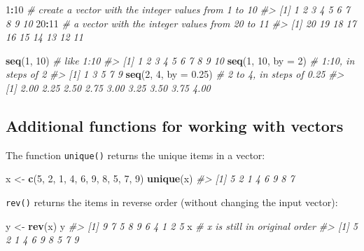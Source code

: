\documentclass[]{book}
\newenvironment{Shaded}{\begin{snugshade}}{\end{snugshade}}
\newcommand{\CommentTok}[1]{\textcolor[rgb]{0.56,0.35,0.01}{\textit{#1}}}
\newcommand{\DataTypeTok}[1]{\textcolor[rgb]{0.13,0.29,0.53}{#1}}
\newcommand{\DecValTok}[1]{\textcolor[rgb]{0.00,0.00,0.81}{#1}}
\newcommand{\FloatTok}[1]{\textcolor[rgb]{0.00,0.00,0.81}{#1}}
\newcommand{\KeywordTok}[1]{\textcolor[rgb]{0.13,0.29,0.53}{\textbf{#1}}}
\newcommand{\NormalTok}[1]{#1}
\newcommand{\OperatorTok}[1]{\textcolor[rgb]{0.81,0.36,0.00}{\textbf{#1}}}
\newcommand{\StringTok}[1]{\textcolor[rgb]{0.31,0.60,0.02}{#1}}
\theoremstyle{definition}
\theoremstyle{definition}
\theoremstyle{definition}
\theoremstyle{remark}
\begin{document}
\begin{Shaded}
\begin{Highlighting}[]
\DecValTok{1}\OperatorTok{:}\DecValTok{10}  \CommentTok{# create a vector with the integer values from 1 to 10}
\CommentTok{#>  [1]  1  2  3  4  5  6  7  8  9 10}
\DecValTok{20}\OperatorTok{:}\DecValTok{11}  \CommentTok{# a vector with the integer values from 20 to 11}
\CommentTok{#>  [1] 20 19 18 17 16 15 14 13 12 11}

\KeywordTok{seq}\NormalTok{(}\DecValTok{1}\NormalTok{, }\DecValTok{10}\NormalTok{)  }\CommentTok{# like 1:10}
\CommentTok{#>  [1]  1  2  3  4  5  6  7  8  9 10}
\KeywordTok{seq}\NormalTok{(}\DecValTok{1}\NormalTok{, }\DecValTok{10}\NormalTok{, }\DataTypeTok{by =} \DecValTok{2}\NormalTok{) }\CommentTok{# 1:10, in steps of 2}
\CommentTok{#> [1] 1 3 5 7 9}
\KeywordTok{seq}\NormalTok{(}\DecValTok{2}\NormalTok{, }\DecValTok{4}\NormalTok{, }\DataTypeTok{by =} \FloatTok{0.25}\NormalTok{) }\CommentTok{# 2 to 4, in steps of 0.25}
\CommentTok{#> [1] 2.00 2.25 2.50 2.75 3.00 3.25 3.50 3.75 4.00}
\end{Highlighting}
\end{Shaded}

\hypertarget{additional-functions-for-working-with-vectors}{%
\subsection{Additional functions for working with
vectors}\label{additional-functions-for-working-with-vectors}}

The function \texttt{unique()} returns the unique items in a vector:

\begin{Shaded}
\begin{Highlighting}[]
\NormalTok{x <-}\StringTok{ }\KeywordTok{c}\NormalTok{(}\DecValTok{5}\NormalTok{, }\DecValTok{2}\NormalTok{, }\DecValTok{1}\NormalTok{, }\DecValTok{4}\NormalTok{, }\DecValTok{6}\NormalTok{, }\DecValTok{9}\NormalTok{, }\DecValTok{8}\NormalTok{, }\DecValTok{5}\NormalTok{, }\DecValTok{7}\NormalTok{, }\DecValTok{9}\NormalTok{)}
\KeywordTok{unique}\NormalTok{(x)}
\CommentTok{#> [1] 5 2 1 4 6 9 8 7}
\end{Highlighting}
\end{Shaded}

\texttt{rev()} returns the items in reverse order (without changing the
input vector):

\begin{Shaded}
\begin{Highlighting}[]
\NormalTok{y <-}\StringTok{ }\KeywordTok{rev}\NormalTok{(x)}
\NormalTok{y}
\CommentTok{#>  [1] 9 7 5 8 9 6 4 1 2 5}
\NormalTok{x  }\CommentTok{# x is still in original order}
\CommentTok{#>  [1] 5 2 1 4 6 9 8 5 7 9}
\end{Highlighting}
\end{Shaded}
\end{document}
